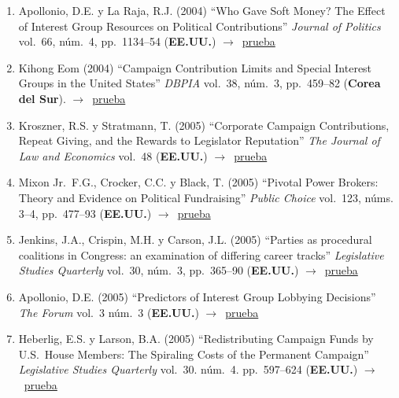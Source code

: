 \documentclass[12 pt, letter]{article}
\newenvironment{CitasMiTrabajo}{
    \begin{footnotesize}
    \begin{enumerate}[label={\footnotesize\emph{cita~\arabic*}},ref=\arabic*] %
        \setlength{\itemsep}{.1\itemsep}
        \setlength{\parskip}{.1\parskip}
    }{\end{enumerate}\end{footnotesize}}
\begin{document}
\begin{CitasMiTrabajo}
        \item Apollonio, D.E. y La Raja, R.J. (2004)
        ``Who Gave Soft Money?
        The Effect of Interest Group Resources on Political Contributions''
        \emph{Journal of Politics} vol.\ 66, n\'um.\ 4, pp.\ 1134--54  (\textbf{EE.UU.}) $\rightarrow$~\href{http://ericmagar.com/cv/cites/coxMagar/apolRaja.pdf}{prueba}

        \item Kihong Eom (2004)
        ``Campaign Contribution
        Limits and Special Interest Groups in the United States'' \emph{DBPIA} vol.\
        38, n\'um.\ 3, pp.\ 459--82  (\textbf{Corea del Sur}). $\rightarrow$~\href{http://ericmagar.com/cv/cites/coxMagar/eom.pdf}{prueba}

        \item Kroszner, R.S. y Stratmann, T. (2005)
        ``Corporate Campaign Contributions, Repeat Giving, and the Rewards to
        Legislator Reputation''
        \emph{The Journal of Law and Economics} vol.\ 48 (\textbf{EE.UU.}) $\rightarrow$~\href{http://ericmagar.com/cv/cites/coxMagar/kros.pdf}{prueba}

        \item Mixon Jr.\, F.G., Crocker, C.C. y Black, T. (2005)
        ``Pivotal Power Brokers:
        Theory and Evidence on Political Fundraising'' \emph{Public Choice} vol.\ 123,
        n\'ums. 3--4, pp.\ 477--93  (\textbf{EE.UU.}) $\rightarrow$~\href{http://ericmagar.com/cv/cites/coxMagar/mixon.pdf}{prueba}

        \item Jenkins, J.A., Crispin, M.H. y Carson, J.L. (2005)
        ``Parties as procedural coalitions in Congress: an examination of differing career tracks''
        \emph{Legislative Studies Quarterly} vol.\ 30, n\'um.\ 3, pp.\ 365--90  (\textbf{EE.UU.}) $\rightarrow$~\href{http://ericmagar.com/cv/cites/coxMagar/jenkinsetal2005lsq.pdf}{prueba}

       \item Apollonio, D.E. (2005) ``Predictors of Interest Group Lobbying Decisions'' \emph{The Forum} vol.\ 3 n\'um.\ 3 (\textbf{EE.UU.}) $\rightarrow$~\href{http://ericmagar.com/cv/cites/coxMagar/Apollonio2005.pdf}{prueba}

       \item Heberlig, E.S. y Larson, B.A. (2005) ``Redistributing Campaign Funds by U.S.\ House Members: The Spiraling Costs of the Permanent Campaign'' \emph{Legislative Studies Quarterly} vol.\ 30. n\'um.\ 4. pp.\ 597--624 (\textbf{EE.UU.}) $\rightarrow$~\href{http://ericmagar.com/cv/cites/coxMagar/heberlig+larson2005lsq.excerpt.pdf}{prueba}


\end{CitasMiTrabajo}
\end{document}
